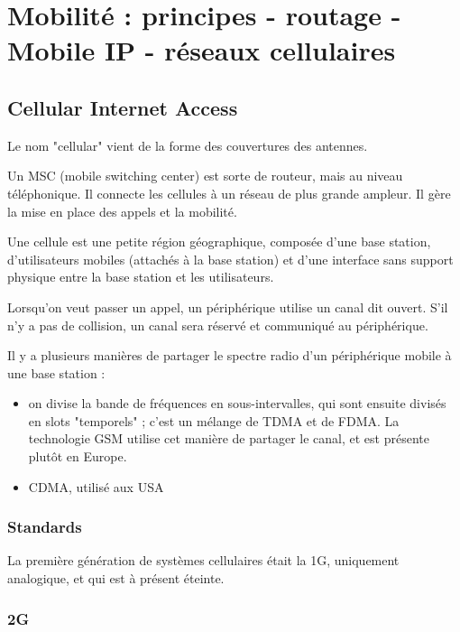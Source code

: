 \chapter{Mobilité : principes - routage - Mobile IP - réseaux cellulaires}

\section{Cellular Internet Access}
	
	Le nom "cellular" vient de la forme des couvertures des antennes.
	
	
	Un MSC (mobile switching center) est sorte de routeur, mais au niveau téléphonique. Il connecte les cellules à un réseau de plus grande ampleur. Il gère la mise en place des appels et la mobilité.
	
	Une cellule est une petite région géographique, composée d'une base station, d'utilisateurs mobiles (attachés à la base station) et d'une interface sans support physique entre la base station et les utilisateurs.
	
  Lorsqu'on veut passer un appel, un périphérique utilise un canal dit ouvert. S'il n'y a pas de collision, un canal sera réservé et communiqué au périphérique.
  
  Il y a plusieurs manières de partager le spectre radio d'un périphérique mobile à une base station :
  
  \begin{itemize}
    \item on divise la bande de fréquences en sous-intervalles, qui sont ensuite divisés en slots "temporels" ; c'est un mélange de TDMA et de FDMA. La technologie GSM utilise cet manière de partager le canal, et est présente plutôt en Europe.
    
    
    \item CDMA, utilisé aux USA
  \end{itemize}
  
  \subsection{Standards}
  
  La première génération de systèmes cellulaires était la 1G, uniquement analogique, et qui est à présent éteinte. 
  
  	\subsection{2G}
  	
